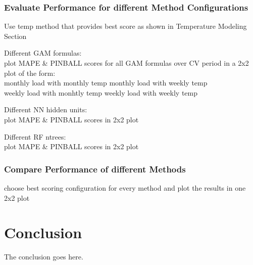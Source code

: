 \documentclass[conference]{IEEEtran}
\begin{document}
\subsubsection{Evaluate Performance for different Method Configurations}
Use temp method that provides best score as shown in Temperature Modeling Section\par
Different GAM formulas:\\
plot MAPE \& PINBALL scores for all GAM formulas over CV period in a 2x2 plot of the form:\\
monthly load with monthly temp \quad monthly load with weekly temp\\
weekly load with monhtly temp \quad weekly load with weekly temp\par
\vspace*{5pt}
Different NN hidden units:\\
plot MAPE \& PINBALL scores in 2x2 plot\par
Different RF ntrees:\\ 
plot MAPE \& PINBALL scores in 2x2 plot\par

\subsubsection{Compare Performance of different Methods}
choose best scoring configuration for every method and plot the results in one 2x2 plot

%

\section{Conclusion}
The conclusion goes here.


{}
\end{document}
